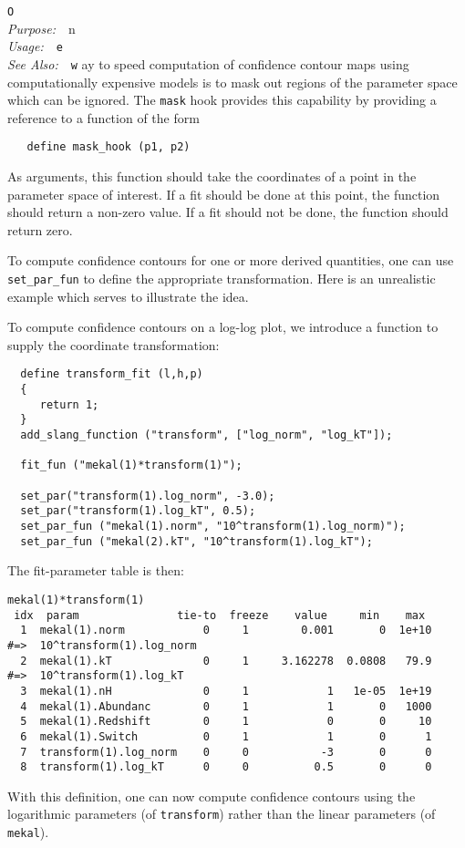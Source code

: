 \documentclass{book}
\makeatletter
\newif\ifpdf
\newenvironment{isisfunction}[4]%
{\index{{#1}@{\tt #1}}%
  \ifpdf
  \else
     \addcontentsline{toc}{subsection}{{#1} -- {#2}}
  \fi
  \vbox{
          \vspace*{\baselineskip}
          {\LARGE\tt #1}\vspace*{\baselineskip}\\
          {{\it Purpose:}~~{#2}}\\
          {{\it Usage:}~~{\tt #3}}\\
          {{\it See Also:}~~{\tt #4}}
       }
}%
{ }
\makeatother
\begin{document}
{\begin{isisfunction}
One way to speed computation of confidence contour maps
using computationally expensive models is to mask out
regions of the parameter space which can be ignored.
The \verb|mask| hook provides this capability by providing
a reference to a function of the form
\begin{verbatim}
   define mask_hook (p1, p2)
\end{verbatim}
As arguments, this function should take the coordinates
of a point in the parameter space of interest.  If
a fit should be done at this point, the function should
return a non-zero value.  If a fit should not be done,
the function should return zero.

To compute confidence contours for one or more derived quantities,
one can use \verb|set_par_fun| to define the appropriate
transformation.  Here is an unrealistic example which serves to
illustrate the idea.

To compute confidence contours on a log-log plot, we
introduce a function to supply the coordinate transformation:
\begin{verbatim}
  define transform_fit (l,h,p)
  {
     return 1;
  }
  add_slang_function ("transform", ["log_norm", "log_kT"]);

  fit_fun ("mekal(1)*transform(1)");

  set_par("transform(1).log_norm", -3.0);
  set_par("transform(1).log_kT", 0.5);
  set_par_fun ("mekal(1).norm", "10^transform(1).log_norm)");
  set_par_fun ("mekal(2).kT", "10^transform(1).log_kT");
\end{verbatim}
The fit-parameter table is then:
\begin{verbatim}
mekal(1)*transform(1)
 idx  param               tie-to  freeze    value     min    max
  1  mekal(1).norm            0     1        0.001       0  1e+10
#=>  10^transform(1).log_norm
  2  mekal(1).kT              0     1     3.162278  0.0808   79.9
#=>  10^transform(1).log_kT
  3  mekal(1).nH              0     1            1   1e-05  1e+19
  4  mekal(1).Abundanc        0     1            1       0   1000
  5  mekal(1).Redshift        0     1            0       0     10
  6  mekal(1).Switch          0     1            1       0      1
  7  transform(1).log_norm    0     0           -3       0      0
  8  transform(1).log_kT      0     0          0.5       0      0
\end{verbatim}

With this definition, one can now compute confidence contours
using the logarithmic parameters (of \verb|transform|)
rather than the linear parameters (of \verb|mekal|).


\end{isisfunction}}
\end{document}
